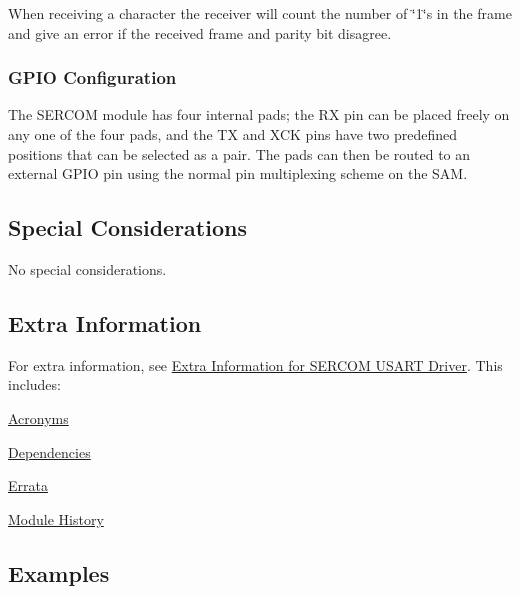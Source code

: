 When receiving a character the receiver will count the number of \char`\"{}1\char`\"{}s in the frame and give an error if the received frame and parity bit disagree.\hypertarget{group__asfdoc__sam0__sercom__usart__group_asfdoc_sam0_sercom_usart_overview_pin_configuration}{}\subsubsection{G\+P\+I\+O Configuration}\label{group__asfdoc__sam0__sercom__usart__group_asfdoc_sam0_sercom_usart_overview_pin_configuration}
The S\+E\+R\+C\+O\+M module has four internal pads; the R\+X pin can be placed freely on any one of the four pads, and the T\+X and X\+C\+K pins have two predefined positions that can be selected as a pair. The pads can then be routed to an external G\+P\+I\+O pin using the normal pin multiplexing scheme on the S\+A\+M.\hypertarget{group__asfdoc__sam0__sercom__usart__group_asfdoc_sam0_sercom_usart_special_considerations}{}\subsection{Special Considerations}\label{group__asfdoc__sam0__sercom__usart__group_asfdoc_sam0_sercom_usart_special_considerations}
No special considerations.\hypertarget{group__asfdoc__sam0__sercom__usart__group_asfdoc_sam0_sercom_usart_extra_info}{}\subsection{Extra Information}\label{group__asfdoc__sam0__sercom__usart__group_asfdoc_sam0_sercom_usart_extra_info}
For extra information, see \hyperlink{asfdoc_sam0_sercom_usart_extra}{Extra Information for S\+E\+R\+C\+O\+M U\+S\+A\+R\+T Driver}. This includes\+:
\begin{DoxyItemize}
\item \hyperlink{asfdoc_sam0_sercom_usart_extra_asfdoc_sam0_sercom_usart_extra_acronyms}{Acronyms}
\item \hyperlink{asfdoc_sam0_sercom_usart_extra_asfdoc_sam0_sercom_usart_extra_dependencies}{Dependencies}
\item \hyperlink{asfdoc_sam0_sercom_usart_extra_asfdoc_sam0_sercom_usart_extra_errata}{Errata}
\item \hyperlink{asfdoc_sam0_sercom_usart_extra_asfdoc_sam0_sercom_usart_extra_history}{Module History}
\end{DoxyItemize}\hypertarget{group__asfdoc__sam0__sercom__usart__group_asfdoc_sam0_sercom_usart_examples}{}\subsection{Examples}\label{group__asfdoc__sam0__sercom__usart__group_asfdoc_sam0_sercom_usart_examples}
